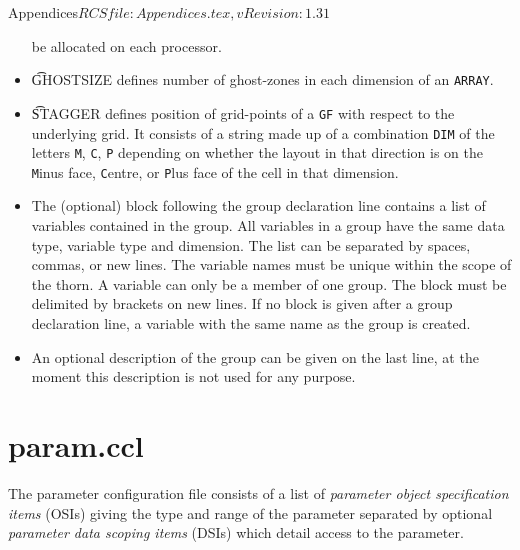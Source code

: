 \begin{cactuspart}{6}{Appendices}{$RCSfile: Appendices.tex,v $}{$Revision: 1.31 $}
\begin{itemize}
        be allocated on each processor.
\item{} {\t GHOSTSIZE} defines number of ghost-zones in each dimension of an {\tt ARRAY}.
\item{} {\t STAGGER} defines position of grid-points of a {\tt GF} with respect to
        the underlying grid.  It consists of a string made up of a combination {\tt DIM}
        of the letters {\tt M}, {\tt C}, {\tt P} depending on whether the layout in
        that direction is on the {\tt M}inus face, {\tt C}entre, or {\tt P}lus face
        of the cell in that dimension.
\item{} The (optional) block following the group declaration line contains a list of
        variables contained in the group. All variables in a group have
        the same data type, variable type and dimension. The list can be
        separated by spaces, commas, or new lines. The variable names
        must be unique within the scope of the thorn.
        A variable can only be a member of
        one group. The block must be delimited by brackets on new lines.
        If no block is given after a group declaration line, a
        variable with the same name as the group is created.
\item{} An optional description of the group can be given on the last line,
        at the moment this description is not used for any purpose.
\end{itemize}

\section{param.ccl}
\label{sec:pa}

The parameter configuration file consists of a list of
{\it parameter object specification items} (OSIs) giving the type and
range of the parameter separated by optional
{\it parameter data scoping items} (DSIs) which detail access to the
parameter.


\end{cactuspart}
